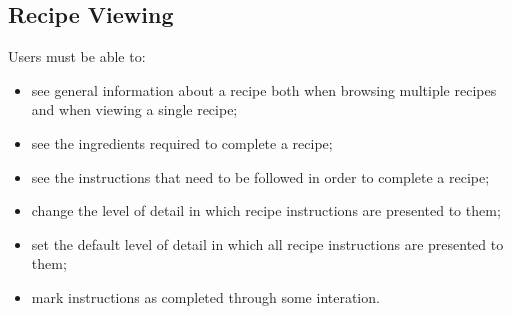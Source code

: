 \documentclass{article}
\begin{document}
\subsection{Recipe Viewing}
Users must be able to:
\begin{itemize}
\item see general information about a recipe both when browsing multiple recipes and when viewing a single recipe;
\item see the ingredients required to complete a recipe;
\item see the instructions that need to be followed in order to complete a recipe;
\item change the level of detail in which recipe instructions are presented to them;
\item set the default level of detail in which all recipe instructions are presented to them;
\item mark instructions as completed through some interation.
\end{itemize}
\end{document}
